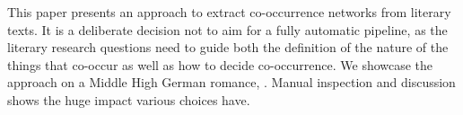 This paper presents an approach to extract co-occurrence networks from literary texts. It is a deliberate decision not to aim for a fully automatic pipeline, as the literary research questions need to guide both the definition of the nature of the things that co-occur as well as how to decide co-occurrence. We showcase the approach on a Middle High German romance, \parz. Manual inspection and discussion shows the huge impact various choices  have.
